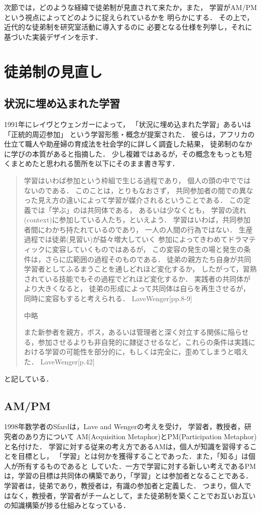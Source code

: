 \documentclass{hissymp}
\begin{document}
次節では，どのような経緯で徒弟制が見直されて来たか，また，
学習がAM/PMという視点によってどのように捉えられているかを
明らかにする．
その上で，近代的な徒弟制を研究室活動に導入するのに
必要となる仕様を列挙し，それに基づいた実装デザインを示す．

\section{徒弟制の見直し}
\label{sec:org894346f}
\subsection{状況に埋め込まれた学習}
\label{sec:org1d6cfa1}
1991年にレイヴとウェンガーによって，
  「状況に埋め込まれた学習」あるいは「正統的周辺参加」
  という学習形態・概念が提案された．
  彼らは，アフリカの仕立て職人や助産婦の育成法を社会学的に詳しく調査した結果，
  徒弟制のなかに学びの本質があると指摘した．
少し複雑ではあるが，その概念をもっとも短くまとめたと思われる箇所を以下にそのまま書き写す．
\begin{quote}
学習はいわば参加という枠組で生じる過程であり，
個人の頭の中でではないのである．
このことは，とりもなおさず，
共同参加者の間での異なった見え方の違いによって学習が媒介されるということである．
この定義では「学ぶ」のは共同体である，
あるいは少なくとも，
学習の流れ(context)に参加している人たち，といえよう．
学習はいわば，共同参加者間にわかち持たれているのであり，
一人の人間の行為ではない．
生産過程では徒弟(見習い)が益々増大していく
参加によってきわめてドラマティックに変容していくものではあるが，
この変容の発生の場と発生の条件は，さらに広範囲の過程そのものである．
徒弟の親方たち自身が共同学習者としてふるまうことを通しどれほど変化するか，
したがって，習熟されている技能でもその過程でどれほど変化するか．
実践者の共同体がより大きくなると，
徒弟の形成によって共同体は自らを再生させるが，
同時に変容もすると考えられる．
LaveWenger[pp.8-9]

中略

また新参者を親方，ボス，あるいは管理者と深く対立する関係に陥らせる，参加させるよりも非自発的に隷従させるなど，これらの条件は実践における学習の可能性を部分的に，もしくは完全に，歪めてしまうと唱えた．
 LaveWenger[p.42]
\end{quote}
と記している．

\subsection{AM/PM}
\label{sec:org2f4cdf7}
1998年数学者のSfardは，Lave and Wengerの考えを受け，
学習者，教授者，研究者のあり方について
AM(Acquisition Metaphor)とPM(Participation Metaphor)と名付けた．
学習に対する従来の考え方であるAMは，個人が知識を習得することを目標とし，
「学習」とは何かを獲得することであった．また，「知る」は個人が所有するものであると
していた．一方で学習に対する新しい考えであるPMは，学習の目標は共同体の構築であり，「学習」とは参加者となることである．学習者は，徒弟であり，教授者は，有識の参加者と定義した．
つまり，個人ではなく，教授者，学習者がチームとして，また徒弟制を築くことでお互いお互いの知識構築が捗る仕組みとなっている．
\end{document}
